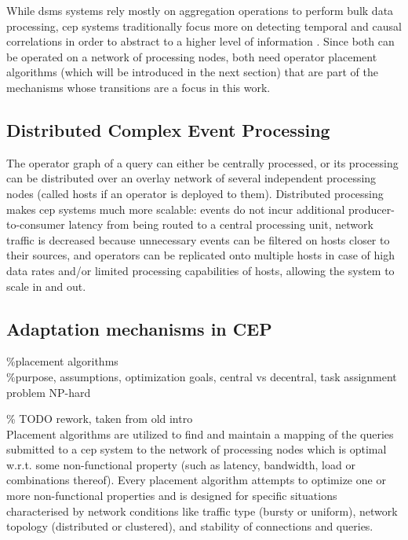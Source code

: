 While \gls{dsms} systems rely mostly on aggregation operations to perform bulk data processing, \gls{cep} systems traditionally focus more on detecting temporal and causal correlations in order to abstract to a higher level of information \cite{Cugola2012}. Since both can be operated on a network of processing nodes, both need operator placement algorithms (which will be introduced in the next section) that are part of the mechanisms whose transitions are a focus in this work.

\subsection{Distributed Complex Event Processing}
The operator graph of a query can either be centrally processed, or its processing can be distributed over an overlay network of several independent processing nodes (called hosts if an operator is deployed to them). Distributed processing makes \gls{cep} systems much more scalable: events do not incur additional producer-to-consumer latency from being routed to a central processing unit, network traffic is decreased because unnecessary events can be filtered on hosts closer to their sources, and operators can be replicated onto multiple hosts in case of high data rates and/or limited processing capabilities of hosts, allowing the system to scale in and out.


\subsection{Adaptation mechanisms in CEP}
\%placement algorithms \\
\%purpose, assumptions, optimization goals, central vs decentral, task assignment problem NP-hard

\% TODO rework, taken from old intro \\
Placement algorithms are utilized to find and maintain a mapping of the queries submitted to a \gls{cep} system to the network of processing nodes which is optimal w.r.t. some non-functional property (such as latency, bandwidth, load or combinations thereof).
 Every placement algorithm attempts to optimize one or more non-functional properties and is designed  for specific situations characterised by network conditions like traffic type (bursty or uniform), network topology (distributed or clustered), and stability of connections and queries. 

